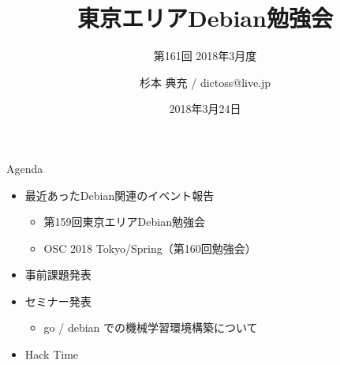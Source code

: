 \title{東京エリアDebian勉強会}
\subtitle{第161回 2018年3月度}
\author{杉本 典充 / dictoss@live.jp}
\date{2018年3月24日}



\begin{frame}
\titlepage{}
\end{frame}

\begin{frame}{Agenda}
 \begin{minipage}[t]{0.45\hsize}
  \begin{itemize}
  \item 最近あったDebian関連のイベント報告
    \begin{itemize}
    \item 第159回東京エリアDebian勉強会
    \item OSC 2018 Tokyo/Spring（第160回勉強会）
    \end{itemize}
  \item 事前課題発表
  \end{itemize}
 \end{minipage}
 \begin{minipage}[t]{0.45\hsize}
  \begin{itemize}
  \item セミナー発表
    \begin{itemize}
    \item go / debian での機械学習環境構築について
    \end{itemize}
  \item Hack Time
  \end{itemize}
 \end{minipage}
\end{frame}

